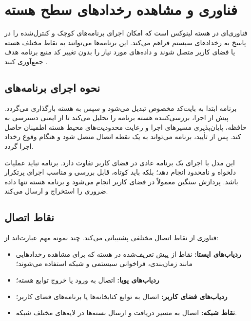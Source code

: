 \section{فناوری  و مشاهده رخدادهای سطح هسته}
\label{sec:ebpf}

 فناوری‌ای در هسته لینوکس است که امکان اجرای برنامه‌های کوچک و
کنترل‌شده را در پاسخ به رخدادهای سیستم فراهم می‌کند. این برنامه‌ها می‌توانند به
نقاط مختلف هسته یا فضای کاربر متصل شوند و داده‌های مورد نیاز را بدون تغییر کد
منبع برنامه هدف جمع‌آوری کنند \cite{ebpfdocs}.

\subsection{نحوه اجرای برنامه‌های }

برنامه  ابتدا به بایت‌کد مخصوص تبدیل می‌شود و سپس به هسته بارگذاری
می‌گردد. پیش از اجرا، بررسی‌کننده هسته برنامه را تحلیل
می‌کند تا از ایمنی دسترسی به حافظه، پایان‌پذیری مسیرهای اجرا و رعایت محدودیت‌های
محیط هسته اطمینان حاصل کند. پس از تأیید، برنامه می‌تواند به یک نقطه اتصال متصل
شود و هنگام وقوع رخداد اجرا گردد.

این مدل با اجرای یک برنامه عادی در فضای کاربر تفاوت دارد. برنامه 
نباید عملیات دلخواه و نامحدود انجام دهد؛ بلکه باید کوتاه، قابل بررسی و مناسب
اجرای پرتکرار باشد. پردازش سنگین معمولاً در فضای کاربر انجام می‌شود و برنامه
هسته تنها داده ضروری را استخراج و ارسال می‌کند.

\subsection{نقاط اتصال}

فناوری  از نقاط اتصال مختلفی پشتیبانی می‌کند. چند نمونه مهم عبارت‌اند
از:

\begin{itemize}
    \item \textbf{ردیاب‌های ایستا:} نقاط از پیش تعریف‌شده در هسته که برای
    مشاهده رخدادهایی مانند زمان‌بندی، فراخوانی سیستمی و شبکه استفاده می‌شوند؛
    \item \textbf{ردیاب‌های پویا:} اتصال به ورود یا خروج توابع هسته؛
    \item \textbf{ردیاب‌های فضای کاربر:} اتصال به توابع کتابخانه‌ها یا برنامه‌های
    فضای کاربر؛
    \item \textbf{نقاط شبکه:} اتصال به مسیر دریافت و ارسال بسته‌ها در لایه‌های
    مختلف شبکه.
\end{itemize}

